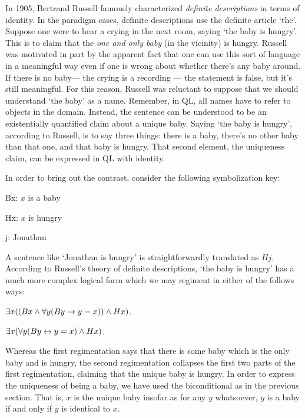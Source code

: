 In 1905, Bertrand Russell famously characterized \emph{definite descriptions} in terms of identity.
In the paradigm cases, definite descriptions use the definite article `the'.
Suppose one were to hear a crying in the next room, saying `the baby is hungry'.
This is to claim that the \emph{one and only baby} (in the vicinity) is hungry.
Russell was motivated in part by the apparent fact that one can use this sort of language in a meaningful way even if one is wrong about whether there's any baby around.
If there is no baby--- the crying is a recording --- the statement is false, but it's still meaningful.
For this reason, Russell was reluctant to suppose that we should understand `the baby' as a name.
Remember, in QL, all names have to refer to objects in the domain.
Instead, the sentence can be understood to be an existentially quantified claim about a unique baby.
Saying `the baby is hungry', according to Russell, is to say three things: there is a baby, there's no other baby than that one, and that baby is hungry.
That second element, the uniqueness claim, can be expressed in QL with identity. 

In order to bring out the contrast, consider the following symbolization key:

\begin{ekey}
  \item[Bx:] $x$ is a baby
  \item[Hx:] $x$ is hungry
  \item[j:] Jonathan
\end{ekey}

A sentence like `Jonathan is hungry' is straightforwardly translated as $Hj$.
According to Russell's theory of definite descriptions, `the baby is hungry' has a much more complex logical form which we may regiment in either of the follows ways:

\begin{earg}
  \item[\ex{Def1}] $\exists x ((Bx \wedge \forall y (By \rightarrow y = x)) \wedge Hx)$.
  \item[\ex{Def2}] $\exists x (\forall y (By \leftrightarrow y = x) \wedge Hx)$.
\end{earg}

Whereas the first regimentation says that there is some baby which is the only baby and is hungry, the second regimentation collapses the first two parts of the first regimentation, claiming that the unique baby is hungry.
In order to express the uniqueness of being a baby, we have used the biconditional as in the previous section.
That is, $x$ is the unique baby insofar as for any $y$ whatsoever, $y$ is a baby if and only if $y$ is identical to $x$.

